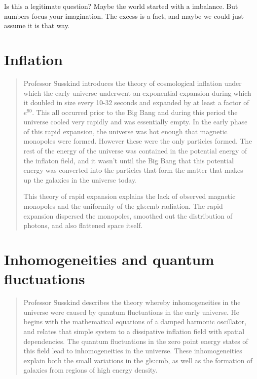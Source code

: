 \documentclass[]{article}
\begin{document}
Is this a legitimate question? Maybe the world started with a imbalance. But numbers focus your imagination. The excess is  a fact, and maybe we could just assume it is that way.

\section{Inflation}

\begin{quotation}
	Professor Susskind introduces the theory of cosmological inflation under which the early universe underwent an exponential expansion during which it doubled in size every 10-32 seconds and expanded by at least a factor of $e^{90}$.  This all occurred prior to the Big Bang and during this period the universe cooled very rapidly and was essentially empty.  In the early phase of this rapid expansion, the universe was hot enough that magnetic monopoles were formed.  However these were the only particles formed.  The rest of the energy of the universe was contained in the potential energy of the inflaton field, and it wasn't until the Big Bang that this potential energy was converted into the particles that form the matter that makes up the galaxies in the universe today.
	
	This theory of rapid expansion explains the lack of observed magnetic monopoles and the uniformity of the \gls{gls:cmb} radiation.  The rapid expansion dispersed the monopoles, smoothed out the distribution of photons, and also flattened space itself.
	
\end{quotation}

\section{Inhomogeneities and quantum fluctuations}

\begin{quotation}
Professor Susskind describes the theory whereby inhomogeneities in the universe were caused by quantum fluctuations in the early universe.  He begins with the mathematical equations of a damped harmonic oscillator, and relates that simple system to a dissipative inflation field with spatial dependencies.  The quantum fluctuations in the zero point energy states of this field lead to inhomogeneities in the universe.  These inhomogeneities explain both the small variations in the \gls{gls:cmb}, as well as the formation of galaxies from regions of high energy density.
\end{quotation}


\printglossaries


\raggedright

\end{document}
